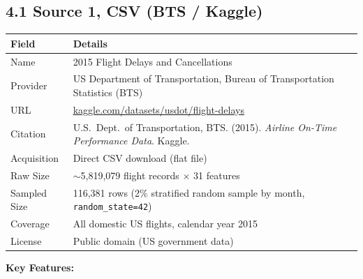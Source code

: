\documentclass{article}
\newcommand{\code}[1]{\texttt{\small #1}}
\begin{document}
\subsection*{\textcolor{accentgold}{4.1 Source 1, CSV (BTS / Kaggle)}}

\begin{tcolorbox}[mainbox, title={Dataset Overview}]
\renewcommand{\arraystretch}{1.4}
\begin{tabularx}{\textwidth}{L{3.2cm} X}
    \toprule
    \textbf{Field} & \textbf{Details} \\
    \midrule
    Name               & 2015 Flight Delays and Cancellations \\
    Provider           & US Department of Transportation, Bureau of Transportation Statistics (BTS) \\
    URL                & \href{https://www.kaggle.com/datasets/usdot/flight-delays}{\textcolor{accentblue}{\underline{kaggle.com/datasets/usdot/flight-delays}}} \\
    Citation           & U.S.\ Dept.\ of Transportation, BTS. (2015). \textit{Airline On-Time Performance Data}. Kaggle. \\
    Acquisition        & Direct CSV download (flat file) \\
    Raw Size           & $\sim$5,819,079 flight records $\times$ 31 features \\
    Sampled Size       & 116,381 rows (2\% stratified random sample by month, \code{random\_state=42}) \\
    Coverage           & All domestic US flights, calendar year 2015 \\
    License            & Public domain (US government data) \\
    \bottomrule
\end{tabularx}
\end{tcolorbox}

\vspace{0.5em}
\textbf{Key Features:}
\end{document}
